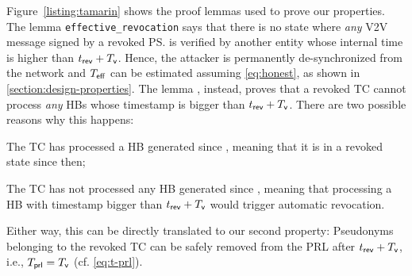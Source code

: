 Figure~\ref{listing:tamarin} shows the proof lemmas used to prove our properties. The
lemma \texttt{effective\_revocation} says that there is no state where
\emph{any} \ac{V2V} message signed by a revoked \ps{} is verified by another entity whose
internal time is higher than $\emph{$t_{\mathsf{rev}}$}{} + \emph{$T_{\mathsf{v}}$}$. Hence, the attacker is
permanently de-synchronized from the network and $\emph{$T_{\mathsf{eff}}$}$ can be estimated
assuming \cref{eq:honest}, as shown in \cref{section:design-properties}. The
lemma , instead, proves
that a revoked \ac{TC} cannot process \emph{any} \acp{HB} whose timestamp is
bigger than $\emph{$t_{\mathsf{rev}}$}{} + \emph{$T_{\mathsf{v}}$}{}$. There are two possible reasons why this
happens:
%
\begin{inparaenum}
  \item The \ac{TC} has processed a \ac{HB} generated since \paramtrev{},
  meaning that it is in a revoked state since then;
  \item The \ac{TC} has not processed any \ac{HB} generated since \paramtrev{},
  meaning that processing a \ac{HB} with timestamp bigger than $\emph{$t_{\mathsf{rev}}$}{} +
  \emph{$T_{\mathsf{v}}$}{}$ would trigger automatic revocation.
\end{inparaenum}
%
Either way, this can be directly translated to our second property: Pseudonyms
belonging to the revoked \ac{TC} can be safely removed from the \ac{PRL} after
$\emph{$t_{\mathsf{rev}}$}{} + \emph{$T_{\mathsf{v}}$}{}$, i.e., $\emph{$T_{\mathsf{prl}}$} = \emph{$T_{\mathsf{v}}$}$ (cf.
\cref{eq:t-prl}).
